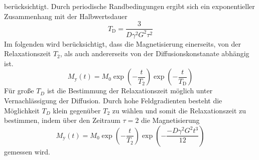 berücksichtigt. Durch periodische Randbedingungen ergibt sich ein exponentieller
Zusammenhang mit der Halbwertsdauer
\begin{equation}%
  \label{eq:diffkoef}
  T_\text{D} = \frac{3}{D \gamma^2 G^2 \tau^2}
\end{equation}
Im folgenden wird berücksichtigt, dass die Magnetisierung einerseits, von der
Relaxationszeit $T_2$, als auch andererseits von der Diffusionskonstanate abhängig ist.
\begin{equation}
		\label{eq:my}
		M_\text{y}(t) = M_0 \exp \left( - \frac{t}{T_2} \right) \exp \left( -
		\frac{t}{T_\text{D}} \right)
\end{equation}
Für große $T_D$ ist die Bestimmung der Relaxationszeit möglich unter
Vernachlässigung der Diffusion. 
Durch hohe Feldgradienten besteht die Möglichkeit $T_D$ klein gegenüber $T_2$
zu wählen und somit die Relaxationszeit zu bestimmen, indem über den Zeitraum 
$\tau = 2$ die Magnetisierung
\begin{equation}
		\label{eq:magy}
		M_\text{y}(t) = M_0 \exp \left( - \frac{t}{T_2} \right) \exp \left( -
		\frac{-D \gamma^2 G^2 t^3}{12} \right)
\end{equation}
gemessen wird.
